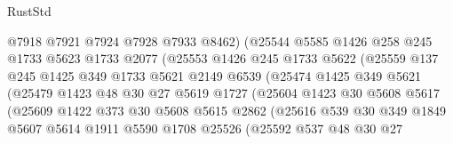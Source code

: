 \begin{lexlean}{RustStd}
\begin{coremodule}
                          @7918
                          @7921
                          @7924
                          @7928
                          @7933
                          @8462)
                        (@25544
                          @5585
                          @1426
                          @258
                          @245
                          @1733
                          @5623
                          @1733
                          @2077
                          (@25553
                            @1426
                            @245
                            @1733
                            @5622
                            (@25559
                              @137
                              @245
                              @1425
                              @349
                              @1733
                              @5621
                              @2149
                              @6539
                              (@25474
                                @1425
                                @349
                                @5621
                                (@25479
                                  @1423
                                  @48
                                  @30
                                  @27
                                  @5619
                                  @1727
                                  (@25604
                                    @1423
                                    @30
                                    @5608
                                    @5617
                                    (@25609
                                      @1422
                                      @373
                                      @30
                                      @5608
                                      @5615
                                      @2862
                                      (@25616
                                        @539
                                        @30
                                        @349
                                        @1849
                                        @5607
                                        @5614
                                        @1911
                                        @5590
                                        @1708
                                        @25526
                                        (@25592
                                          @537
                                          @48
                                          @30
                                          @27

\end{coremodule}
\end{lexlean}
